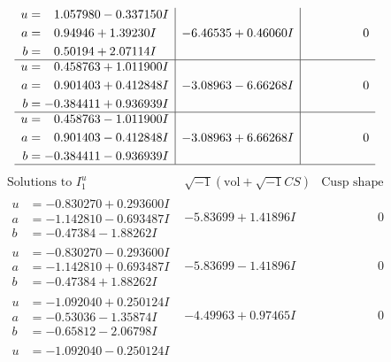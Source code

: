 \documentclass[1p]{elsarticle_modified}
\theoremstyle{definition}
\newcommand{\I}{\sqrt{-1}}
\begin{document}
$$\begin{array}{c|c|c}
\begin{aligned}
u &= \phantom{-}1.057980 - 0.337150 I \\
a &= \phantom{-}0.94946 + 1.39230 I \\
b &= \phantom{-}0.50194 + 2.07114 I\end{aligned}
 & -6.46535 + 0.46060 I & \phantom{-0.000000 } 0 \\ \hline\begin{aligned}
u &= \phantom{-}0.458763 + 1.011900 I \\
a &= \phantom{-}0.901403 + 0.412848 I \\
b &= -0.384411 + 0.936939 I\end{aligned}
 & -3.08963 - 6.66268 I & \phantom{-0.000000 } 0 \\ \hline\begin{aligned}
u &= \phantom{-}0.458763 - 1.011900 I \\
a &= \phantom{-}0.901403 - 0.412848 I \\
b &= -0.384411 - 0.936939 I\end{aligned}
 & -3.08963 + 6.66268 I & \phantom{-0.000000 } 0\\
 \hline 
 \end{array}$$\newpage$$\begin{array}{c|c|c}  
\text{Solutions to }I^u_{1}& \I (\text{vol} + \sqrt{-1}CS) & \text{Cusp shape}\\
 \hline 
\begin{aligned}
u &= -0.830270 + 0.293600 I \\
a &= -1.142810 - 0.693487 I \\
b &= -0.47384 - 1.88262 I\end{aligned}
 & -5.83699 + 1.41896 I & \phantom{-0.000000 } 0 \\ \hline\begin{aligned}
u &= -0.830270 - 0.293600 I \\
a &= -1.142810 + 0.693487 I \\
b &= -0.47384 + 1.88262 I\end{aligned}
 & -5.83699 - 1.41896 I & \phantom{-0.000000 } 0 \\ \hline\begin{aligned}
u &= -1.092040 + 0.250124 I \\
a &= -0.53036 - 1.35874 I \\
b &= -0.65812 - 2.06798 I\end{aligned}
 & -4.49963 + 0.97465 I & \phantom{-0.000000 } 0 \\ \hline\begin{aligned}
u &= -1.092040 - 0.250124 I \\

\end{aligned}
\end{array}$$
\end{document}
